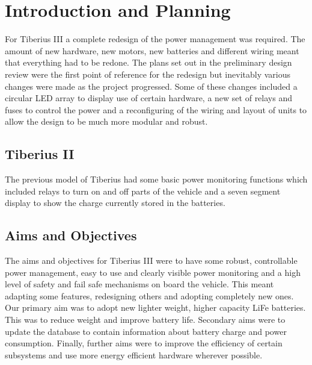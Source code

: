 \section{Introduction and Planning}

For Tiberius III a complete redesign of the power management was required. The amount of new hardware, new motors, new batteries and different wiring meant that everything had to be redone.  The plans set out in the preliminary design review were the first point of reference for the redesign but inevitably various changes were made as the project progressed.
Some of these changes included a circular LED array to display use of certain hardware, a new set of relays and fuses to control the power and a reconfiguring of the wiring and layout of units to allow the design to be much more modular and robust.


\subsection{Tiberius II}

The previous model of Tiberius had some basic power monitoring functions which included relays to turn on and off parts of the vehicle and a seven segment display to show the charge currently stored in the batteries.

\subsection{Aims and Objectives}
The aims and objectives for Tiberius III were to have some robust, controllable power management, easy to use and clearly visible power monitoring and a high level of safety and fail safe mechanisms on board the vehicle.  
This meant adapting some features, redesigning others and adopting completely new ones.  Our primary aim was to adopt new lighter weight, higher capacity LiFe batteries.  This was to reduce weight and improve battery life.  Secondary aims were to update the database to contain information about battery charge  and power consumption.  Finally, further aims were to improve the efficiency of certain subsystems and use more energy efficient hardware wherever possible.
